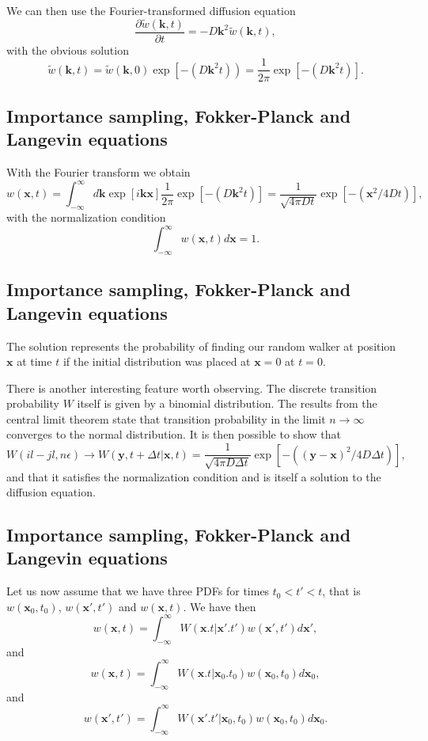 \documentclass[%
oneside,                 %
final,                   %
10pt]{article}
\begin{document}
We can then use the Fourier-transformed diffusion equation 
\[
    \frac{\partial \tilde{w}(\mathbf{k},t)}{\partial t} = -D\mathbf{k}^2\tilde{w}(\mathbf{k},t),
\]
with the obvious solution
\[
   \tilde{w}(\mathbf{k},t)=\tilde{w}(\mathbf{k},0)\exp{\left[-(D\mathbf{k}^2t)\right)}=
    \frac{1}{2\pi}\exp{\left[-(D\mathbf{k}^2t)\right]}. 
\]

\subsection{Importance sampling, Fokker-Planck and Langevin equations}

With the Fourier transform we obtain 
\[
   w(\mathbf{x},t)=\int_{-\infty}^{\infty}d\mathbf{k} \exp{\left[i\mathbf{kx}\right]}\frac{1}{2\pi}\exp{\left[-(D\mathbf{k}^2t)\right]}=
    \frac{1}{\sqrt{4\pi Dt}}\exp{\left[-(\mathbf{x}^2/4Dt)\right]}, 
\]
with the normalization condition
\[
   \int_{-\infty}^{\infty}w(\mathbf{x},t)d\mathbf{x}=1.
\]

\subsection{Importance sampling, Fokker-Planck and Langevin equations}

The solution represents the probability of finding
our random walker at position $\mathbf{x}$ at time $t$ if the initial distribution 
was placed at $\mathbf{x}=0$ at $t=0$. 

There is another interesting feature worth observing. The discrete transition probability $W$
itself is given by a binomial distribution.
The results from the central limit theorem state that 
transition probability in the limit $n\rightarrow \infty$ converges to the normal 
distribution. It is then possible to show that
\[
    W(il-jl,n\epsilon)\rightarrow W(\mathbf{y},t+\Delta t|\mathbf{x},t)=
    \frac{1}{\sqrt{4\pi D\Delta t}}\exp{\left[-((\mathbf{y}-\mathbf{x})^2/4D\Delta t)\right]},
\]
and that it satisfies the normalization condition and is itself a solution
to the diffusion equation.

\subsection{Importance sampling, Fokker-Planck and Langevin equations}

Let us now assume that we have three PDFs for times $t_0 < t' < t$, that is
$w(\mathbf{x}_0,t_0)$, $w(\mathbf{x}',t')$ and $w(\mathbf{x},t)$.
We have then  
\[
   w(\mathbf{x},t)= \int_{-\infty}^{\infty} W(\mathbf{x}.t|\mathbf{x}'.t')w(\mathbf{x}',t')d\mathbf{x}',
\]
and
\[
   w(\mathbf{x},t)= \int_{-\infty}^{\infty} W(\mathbf{x}.t|\mathbf{x}_0.t_0)w(\mathbf{x}_0,t_0)d\mathbf{x}_0,
\]
and
\[
   w(\mathbf{x}',t')= \int_{-\infty}^{\infty} W(\mathbf{x}'.t'|\mathbf{x}_0,t_0)w(\mathbf{x}_0,t_0)d\mathbf{x}_0.
\]
\end{document}
